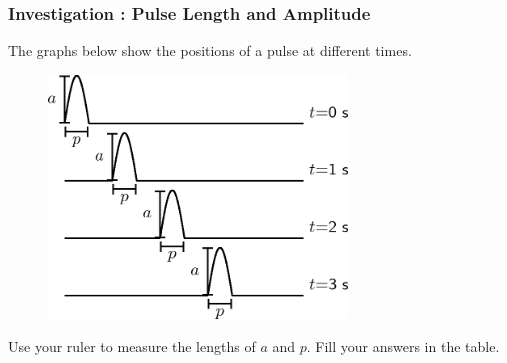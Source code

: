             \subsubsection{  Investigation : Pulse Length and Amplitude }
            \nopagebreak
        \label{m38801*id312993}The graphs below show the positions of a pulse at different times.\par 
        \label{m38801*id312998}
    \setcounter{subfigure}{0}
	\begin{figure}[H] %
    \begin{center}
    \label{m38801*id313002!!!underscore!!!media}\label{m38801*id313002!!!underscore!!!printimage}\includegraphics[width=300px]{col11305.imgs/m38801_PG10C4_003.png} %
      \vspace{2pt}
    \vspace{.1in}
    \end{center}
 \end{figure}       
        \par 
        \label{m38801*id313008}Use your ruler to measure the lengths of $a$ and $p$. Fill your answers in the table.\par 
